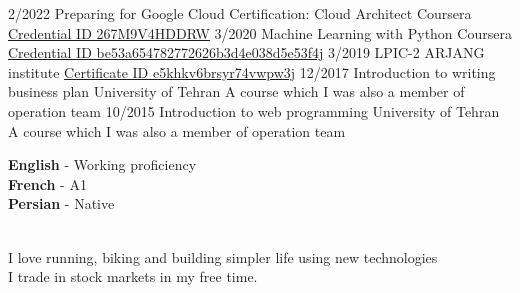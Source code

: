 \documentclass[9pt]{developercv}
\begin{document}

\begin{entrylist}
	\entry
	{2/2022}
	{Preparing for Google Cloud Certification: Cloud Architect}
	{Coursera}
	{{\href{https://www.coursera.org/account/accomplishments/professional-cert/267M9V4HDDRW}{Credential ID 267M9V4HDDRW}}}
	\entry
	{3/2020}
	{Machine Learning with Python}
	{Coursera}
	{{\href{https://www.coursera.org/account/accomplishments/records/8KNW27XHXTVF?utm_medium=Certificate}{Credential ID be53a654782772626b3d4e038d5e53f4j}}}
	\entry
	{3/2019}
	{LPIC-2}
	{ARJANG institute}
	{{\href{http://gotoclass.ir/Certificates/e5khkv6brsyr74vwpw3j/}{Certificate ID e5khkv6brsyr74vwpw3j}}}
	\entry
	{12/2017}
	{Introduction to writing business plan}
	{University of Tehran}
	{A course which I was also a member of operation team}
	\entry
	{10/2015}
	{Introduction to web programming}
	{University of Tehran}
	{A course which I was also a member of operation team}

\end{entrylist}


\begin{minipage}[t]{0.45\textwidth}
	\vspace{-\baselineskip} %


	\textbf{English} - Working proficiency\\
	\textbf{French} - A1\\
	\textbf{Persian} - Native\\\
\end{minipage}
\hfill
\begin{minipage}[t]{0.45\textwidth}
	\vspace{-\baselineskip} %


	I love running, biking and building simpler life using new technologies\\
	I trade in stock markets in my free time.
\end{minipage}
\end{document}
